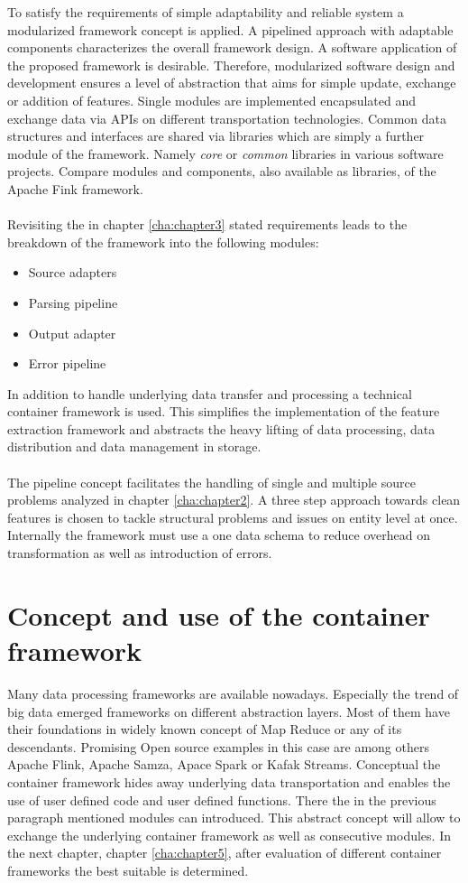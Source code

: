 To satisfy the requirements of simple adaptability and reliable system a modularized framework concept is applied. A pipelined approach with adaptable components characterizes the overall framework design. A software application of the proposed framework is desirable. Therefore, modularized software design and development ensures a level of abstraction that aims for simple update, exchange or addition of features. Single modules are implemented encapsulated and exchange data via APIs on different transportation technologies. Common data structures and interfaces are shared via libraries which are simply a further module of the framework. Namely \textit{core} or \textit{common} libraries in various software projects. Compare modules and components, also available as libraries, of the Apache Fink framework. %
\\\\
Revisiting the in chapter \ref{cha:chapter3} stated requirements leads to the breakdown of the framework into the following modules:
\begin{itemize}
\item Source adapters
\item Parsing pipeline
\item Output adapter
\item Error pipeline
\end{itemize}
In addition to handle underlying data transfer and processing a technical container framework is used. This simplifies the implementation of the feature extraction framework and abstracts the heavy lifting of data processing, data distribution and data management in storage.
\\\\
The pipeline concept facilitates the handling of single and multiple source problems analyzed in chapter \ref{cha:chapter2}. A three step approach towards clean features is chosen to tackle structural problems and issues on entity level at once. Internally the framework must use a one data schema to reduce overhead on transformation as well as introduction of errors.

\section{Concept and use of the container framework \label{sec:containerframework}}

Many data processing frameworks are available nowadays. Especially the trend of big data emerged frameworks on different abstraction layers. Most of them have their foundations in widely known concept of Map Reduce or any of its descendants. Promising Open source examples in this case are among others Apache Flink, Apache Samza, Apace Spark or Kafak Streams. Conceptual the container framework hides away underlying data transportation and enables the use of user defined code and user defined functions. There the in the previous paragraph mentioned modules can introduced. This abstract concept will allow to exchange the underlying container framework as well as consecutive modules. In the next chapter, chapter \ref{cha:chapter5}, after evaluation of different container frameworks the best suitable is determined.

